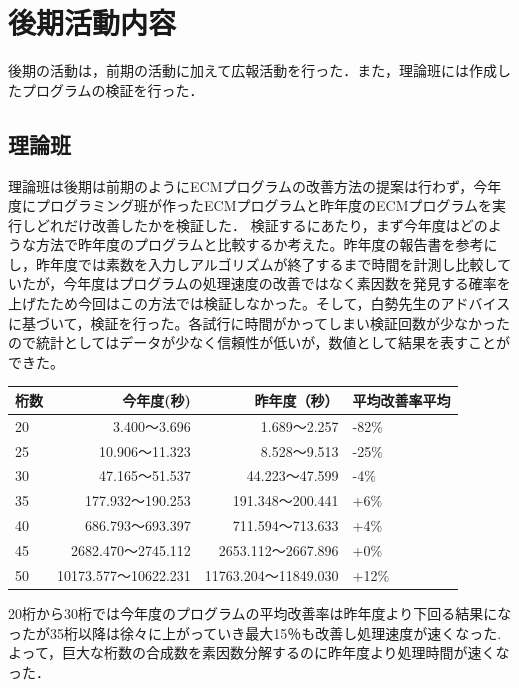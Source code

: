 \documentclass[openany,11pt,papersize]{jsbook}
\begin{document}
\chapter{後期活動内容}
後期の活動は，前期の活動に加えて広報活動を行った．また，理論班には作成したプログラムの検証を行った．

\section{理論班}
\label{sec:theoryresult}
理論班は後期は前期のようにECMプログラムの改善方法の提案は行わず，今年度にプログラミング班が作ったECMプログラムと昨年度のECMプログラムを実行しどれだけ改善したかを検証した．
検証するにあたり，まず今年度はどのような方法で昨年度のプログラムと比較するか考えた。昨年度の報告書を参考にし，昨年度では素数を入力しアルゴリズムが終了するまで時間を計測し比較していたが，今年度はプログラムの処理速度の改善ではなく素因数を発見する確率を上げたため今回はこの方法では検証しなかった。そして，白勢先生のアドバイスに基づいて，検証を行った。各試行に時間がかってしまい検証回数が少なかったので統計としてはデータが少なく信頼性が低いが，数値として結果を表すことができた。

\begin{table}[htb]
  \begin{tabular}{|l|r|r||l|} \hline
    桁数 & 今年度(秒) & 昨年度（秒） & 平均改善率平均 \\ \hline \hline
    20 & 3.400～3.696             & 1.689～2.257             & -82\% \\ \hline
    25 & 10.906～11.323          & 8.528～9.513             & -25\% \\ \hline
    30 & 47.165～51.537          & 44.223～47.599          & -4\% \\ \hline
    35 & 177.932～190.253       & 191.348～200.441       & +6\% \\ \hline
    40 & 686.793～693.397       & 711.594～713.633       & +4\% \\ \hline
    45 & 2682.470～2745.112    & 2653.112～2667.896    & +0\% \\ \hline
    50 & 10173.577～10622.231 & 11763.204～11849.030 & +12\% \\ \hline
  \end{tabular}
\end{table}

20桁から30桁では今年度のプログラムの平均改善率は昨年度より下回る結果になったが35桁以降は徐々に上がっていき最大15％も改善し処理速度が速くなった.よって，巨大な桁数の合成数を素因数分解するのに昨年度より処理時間が速くなった．
\end{document}
